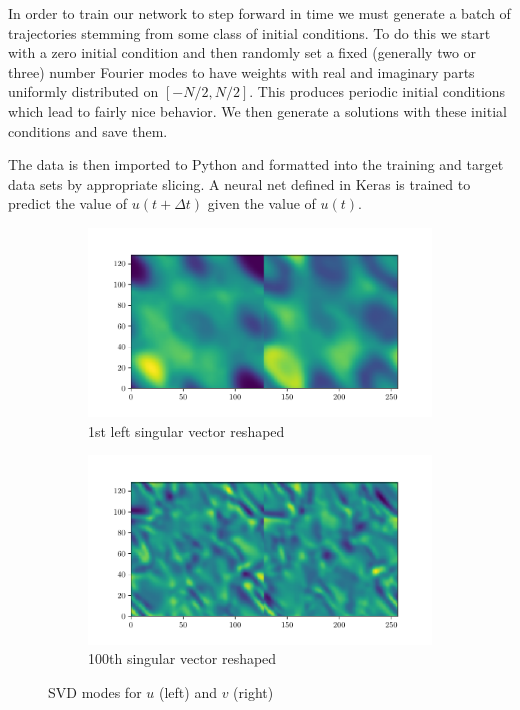 \documentclass[10pt]{article}
\begin{document}
In order to train our network to step forward in time we must generate a batch of trajectories stemming from some class of initial conditions. To do this we start with a zero initial condition and then randomly set a fixed (generally two or three) number Fourier modes to have weights with real and imaginary parts uniformly distributed on \( [-N/2,N/2] \). This produces periodic initial conditions which lead to fairly nice behavior. We then generate a solutions with these initial conditions and save them.

The data is then imported to Python and formatted into the training and target data sets by appropriate slicing. A neural net defined in Keras is trained to predict the value of \( u(t+\Delta t) \) given the value of \( u(t) \).

\begin{figure}[t]\centering
\begin{subfigure}{.45\textwidth}\centering
    \includegraphics[width=\textwidth]{img/svd_mode_1.pdf}
    \caption{1st left singular vector reshaped}
    \label{1mode}
\end{subfigure}\hfill
\begin{subfigure}{.45\textwidth}\centering
    \includegraphics[width=\textwidth]{img/svd_mode_100.pdf}
    \caption{100th singular vector reshaped}
    \label{100mode}
\end{subfigure}
\caption{SVD modes for \( u \) (left) and \( v \) (right) }
\label{SVD_modes}
\end{figure}
\end{document}
